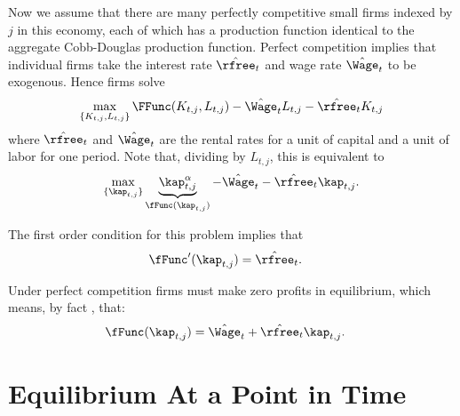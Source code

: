 \documentclass{handout}
\begin{document}
Now we assume that there are many perfectly competitive small firms  indexed by $j$
in this economy, each of which has a production function identical to
the aggregate Cobb-Douglas production function.  Perfect competition 
implies that individual firms take the interest
rate $\hat{\rfree}_{t}$ and wage rate $\hat{\Wage}_{t}$ to be exogenous.  Hence
firms solve 
\begin{equation}
        \max_{\{K_{t,j},L_{t,j}\}} \FFunc(K_{t,j},L_{t,j}) - \hat{\Wage}_{t}L_{t,j} - \hat{\rfree}_{t}K_{t,j}
\end{equation}
where $\hat{\rfree}_{t}$ and $\hat{\Wage}_{t}$ are the rental rates for a unit 
of capital and a unit of labor for one period.  Note that, dividing by 
$L_{t,j}$, this is equivalent to
\begin{equation}
        \max_{\{ \kap_{t,j} \}} \underbrace{\kap_{t,j}^{\alpha}}_{\fFunc(\kap_{t,j})} - \hat{\Wage}_{t} - \hat{\rfree}_{t} \kap_{t,j}.
\end{equation}

The first order condition for this problem implies that
\begin{equation}\begin{gathered}\begin{aligned}
        \fFunc^{\prime}(\kap_{t,j}) & =  \hat{\rfree}_{t}.
\end{aligned}\end{gathered}\end{equation}

Under perfect competition firms must make zero profits in equilibrium,
which means, by fact \EulersTheorem, that:
\begin{equation}\begin{gathered}\begin{aligned}
        \fFunc(\kap_{t,j}) & =  \hat{\Wage}_{t}+\hat{\rfree}_{t}\kap_{t,j}.
\end{aligned}\end{gathered}\end{equation}

\section{Equilibrium At a Point in Time}
\end{document}
